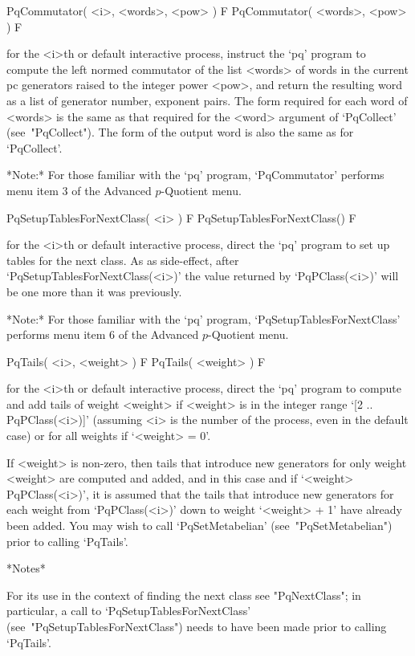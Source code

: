 \>PqCommutator( <i>, <words>, <pow> ) F
\>PqCommutator( <words>, <pow> ) F

for the <i>th or default interactive {\ANUPQ} process, instruct the  `pq'
program to compute the left normed commutator  of  the  list  <words>  of
words in the current pc generators raised to the integer power <pow>, and
return the resulting word as a list of generator number, exponent  pairs.
The form required for each word of <words> is the same as  that  required
for the <word> argument of `PqCollect' (see~"PqCollect"). The form of the
output word is also the same as for `PqCollect'.

*Note:*
For those familiar with the `pq' program,  `PqCommutator'  performs  menu
item 3 of the Advanced $p$-Quotient menu.

\>PqSetupTablesForNextClass( <i> ) F
\>PqSetupTablesForNextClass() F

for the <i>th or default interactive {\ANUPQ} process,  direct  the  `pq'
program  to  set  up  tables  for  the  next  class.  As  as  side-effect,
after   `PqSetupTablesForNextClass(<i>)'   the    value    returned    by
`PqPClass(<i>)' will be one more than it was previously.

*Note:* 
For those familiar  with  the  `pq'  program,  `PqSetupTablesForNextClass'
performs menu item 6 of the Advanced $p$-Quotient menu.

\>PqTails( <i>, <weight> ) F
\>PqTails( <weight> ) F

for the <i>th or default interactive {\ANUPQ} process,  direct  the  `pq'
program to compute and add tails of weight <weight> if <weight> is in  the
integer range `[2 .. PqPClass(<i>)]' (assuming <i> is the number  of  the
process, even in the default case) or for all weights if `<weight> = 0'.

If <weight> is non-zero, then tails that  introduce  new  generators  for
only weight <weight> are computed and added, and  in  this  case  and  if
`<weight> \< PqPClass(<i>)', it is assumed that the tails that  introduce
new generators for  each  weight  from  `PqPClass(<i>)'  down  to  weight
`<weight>  +  1'  have  already  been  added.  You  may  wish   to   call
`PqSetMetabelian' (see~"PqSetMetabelian") prior to calling `PqTails'.

*Notes*

For its use in the context of finding the next class  see  "PqNextClass";
in     particular,     a     call     to      `PqSetupTablesForNextClass'
(see~"PqSetupTablesForNextClass")  needs  to  have  been  made  prior  to
calling `PqTails'.

